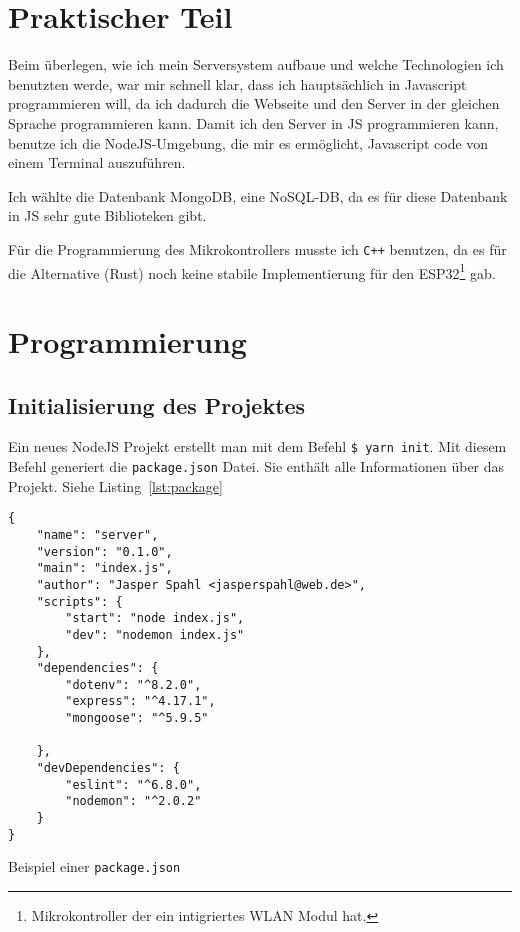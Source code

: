\documentclass[a4paper, ngerman, 12pt]{scrartcl}
\begin{document}
\section{Praktischer Teil}

Beim überlegen, wie ich mein Serversystem aufbaue und welche Technologien ich benutzten werde, war mir schnell klar, dass ich hauptsächlich in Javascript programmieren will, da ich dadurch die Webseite und den Server in der gleichen Sprache programmieren kann.
Damit ich den Server in JS programmieren kann, benutze ich die NodeJS-Umgebung, die mir es ermöglicht, Javascript code von einem Terminal auszuführen.

Ich wählte die Datenbank MongoDB, eine NoSQL-DB, da es für diese Datenbank in JS sehr gute Biblioteken gibt. 

Für die Programmierung des Mikrokontrollers musste ich \texttt{C++} benutzen, da es für die Alternative (Rust)
noch keine stabile Implementierung für den ESP32\footnote{Mikrokontroller der ein intigriertes WLAN Modul hat.} gab.

\section{Programmierung}

\subsection{Initialisierung des Projektes} %

Ein neues NodeJS Projekt erstellt man mit dem Befehl \texttt{\$ yarn init}.
Mit diesem Befehl generiert die \texttt{package.json} Datei.
Sie enthält alle Informationen über das Projekt. Siehe Listing~\ref{lst:package}


\begin{listing}[ht]
\centering
\begin{verbatim}
{
	"name": "server",
	"version": "0.1.0",
	"main": "index.js",
	"author": "Jasper Spahl <jasperspahl@web.de>",
	"scripts": {
		"start": "node index.js",
		"dev": "nodemon index.js"
	},
	"dependencies": {
		"dotenv": "^8.2.0",
		"express": "^4.17.1",
		"mongoose": "^5.9.5"

	},
	"devDependencies": {
		"eslint": "^6.8.0",
		"nodemon": "^2.0.2"
	}
}
\end{verbatim}
\caption{Beispiel einer \texttt{package.json}\label{lst:package}}
\end{listing}
\end{document}
